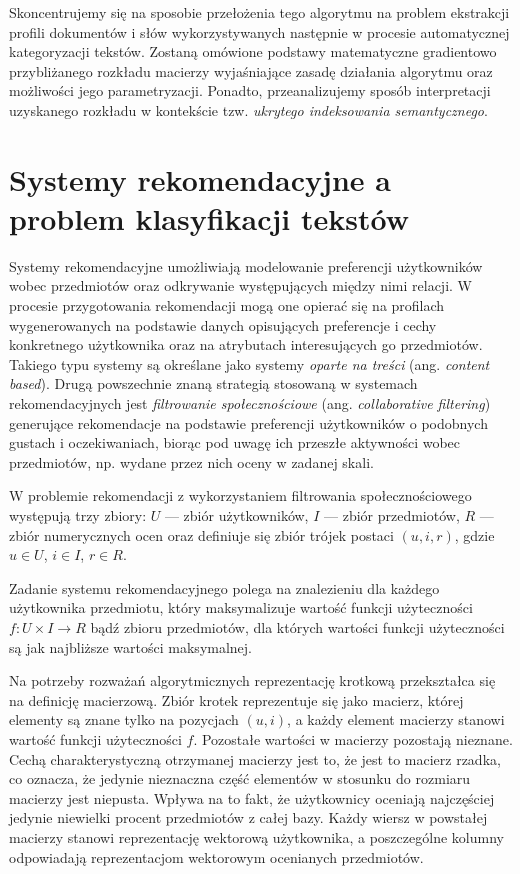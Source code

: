 \documentclass{pracamgr}
\begin{document}
Skoncentrujemy się na sposobie przełożenia tego algorytmu na problem ekstrakcji profili dokumentów i słów wykorzystywanych następnie w procesie automatycznej kategoryzacji tekstów. Zostaną omówione podstawy matematyczne gradientowo przybliżanego rozkładu macierzy wyjaśniające zasadę działania algorytmu oraz możliwości jego parametryzacji. Ponadto, przeanalizujemy sposób interpretacji uzyskanego rozkładu w kontekście tzw. \textit{ukrytego indeksowania semantycznego}.

\section{Systemy rekomendacyjne a problem klasyfikacji tekstów}

Systemy rekomendacyjne umożliwiają modelowanie preferencji użytkowników wobec przedmiotów oraz odkrywanie występujących między nimi relacji. W procesie przygotowania rekomendacji mogą one opierać się na profilach wygenerowanych na podstawie danych opisujących preferencje i cechy konkretnego użytkownika oraz na atrybutach interesujących go przedmiotów. Takiego typu systemy są określane jako systemy \textit{oparte na treści} (ang. \textit{content based}). Drugą powszechnie znaną strategią stosowaną w systemach rekomendacyjnych jest \textit{filtrowanie społecznościowe} (ang. \textit{collaborative filtering}) generujące rekomendacje na podstawie preferencji użytkowników o podobnych gustach i oczekiwaniach, biorąc pod uwagę ich przeszłe aktywności wobec przedmiotów, np. wydane przez nich oceny w zadanej skali.

W problemie rekomendacji z wykorzystaniem filtrowania społecznościowego występują trzy zbiory: $U$ --- zbiór użytkowników, $I$ --- zbiór przedmiotów, $R$ --- zbiór numerycznych ocen oraz definiuje się zbiór trójek postaci $(u, i, r)$, gdzie $u \in U$, $i \in I$, $r \in R$.

Zadanie systemu rekomendacyjnego polega na znalezieniu dla każdego użytkownika przedmiotu, który maksymalizuje wartość funkcji użyteczności $f : U \times I \rightarrow R$ bądź zbioru przedmiotów, dla których wartości funkcji użyteczności są jak najbliższe wartości maksymalnej.

Na potrzeby rozważań algorytmicznych reprezentację krotkową przekształca się na definicję macierzową. Zbiór krotek reprezentuje się jako macierz, której elementy są znane tylko na pozycjach $(u, i)$, a każdy element macierzy stanowi wartość funkcji użyteczności $f$. Pozostałe wartości w macierzy pozostają nieznane. Cechą charakterystyczną otrzymanej macierzy jest to, że jest to macierz rzadka, co oznacza, że jedynie nieznaczna część elementów w stosunku do rozmiaru macierzy jest niepusta. Wpływa na to fakt, że użytkownicy oceniają najczęściej jedynie niewielki procent przedmiotów z całej bazy. Każdy wiersz w powstałej macierzy stanowi reprezentację wektorową użytkownika, a poszczególne kolumny odpowiadają reprezentacjom wektorowym ocenianych przedmiotów.
\end{document}
